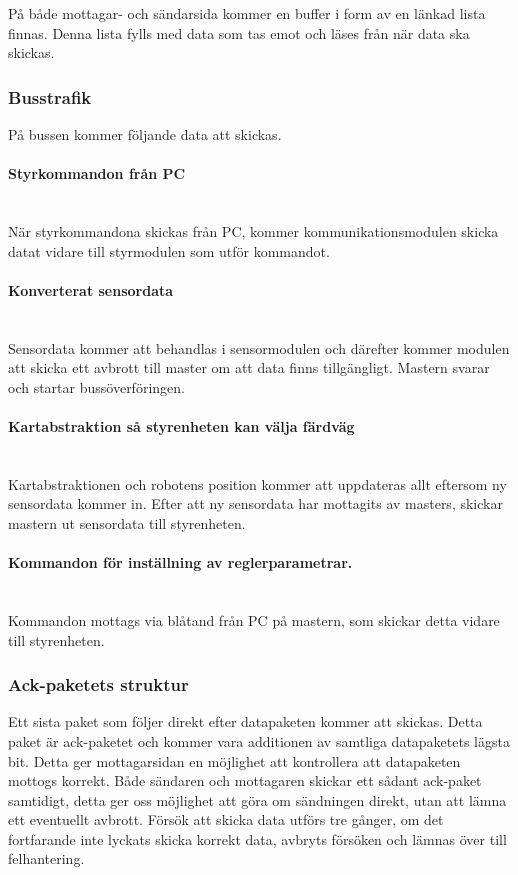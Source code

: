 \documentclass[a4paper,12pt,fleqn]{article}
\begin{document}
På både mottagar- och sändarsida kommer en buffer i form av en länkad lista finnas. Denna lista fylls med data som tas emot och läses från när data ska skickas. 


\subsubsection{Busstrafik}
På bussen kommer följande data att skickas.
\paragraph{Styrkommandon från PC}
~\\
När styrkommandona skickas från PC, kommer kommunikationsmodulen skicka datat vidare till styrmodulen som utför kommandot.
\paragraph{Konverterat sensordata}
~\\
Sensordata kommer att behandlas i sensormodulen och därefter kommer modulen att skicka ett avbrott till master om att data finns tillgängligt. Mastern svarar och startar bussöverföringen.
\paragraph{Kartabstraktion så styrenheten kan välja färdväg}
~\\
Kartabstraktionen och robotens position kommer att uppdateras allt eftersom ny sensordata kommer in. Efter att ny sensordata har  mottagits av masters, skickar mastern ut sensordata till styrenheten.
\paragraph{Kommandon för inställning av reglerparametrar.}
~\\
Kommandon mottags via blåtand från PC på mastern, som skickar detta vidare till styrenheten. 


\subsubsection{Ack-paketets struktur}
Ett sista paket som följer direkt efter datapaketen kommer att skickas. Detta paket är ack-paketet och kommer vara additionen av samtliga datapaketets lägsta bit. Detta ger mottagarsidan en möjlighet att kontrollera att datapaketen mottogs korrekt.
Både sändaren och mottagaren skickar ett sådant ack-paket samtidigt, detta ger oss möjlighet att göra om sändningen direkt, utan att lämna ett eventuellt avbrott. Försök att skicka data utförs tre gånger, om det fortfarande inte lyckats skicka korrekt data, avbryts försöken och lämnas över till felhantering. 
\end{document}
